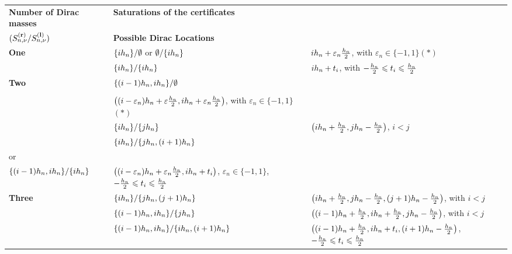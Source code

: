 \begin{table}
\begin{center}
    \renewcommand{\arraystretch}{1.5}\small
    \begin{tabular}{|m{1.6cm}|>{\centering\scriptsize}m{4.3cm}|>{\scriptsize}m{8.1cm}|}
    \hline
    \textbf{Number of Dirac masses } & \textbf{\small Saturations of the certificates} \\ $(S_{n,\nu}^{\mathbf{(r)}} /  S_{n,\nu}^{\mathbf{(l)}})$ & \textbf{\small Possible Dirac Locations}\\
    \hline
    \multirow{2}{*}{\textbf{One}} & $\{i{h_n}\} /\emptyset $ or $\emptyset/\{i{h_n}\}$  &$i{h_n}+\varepsilon_n\frac{{h_n}}{2}$, with $\varepsilon_n\in\{-1,1\}$\quad\hfill $(\ast)$ \\
& $\{i{h_n}\}/\{i{h_n}\}$ &  $i{h_n}+t_i$, with $-\frac{{h_n}}{2}\leqslant t_i\leqslant \frac{{h_n}}{2}$\\\hline
\multirow{4}{*}{\textbf{Two}} & $\{(i-1){h_n},i{h_n}\}/\emptyset$\\ or \\ $\emptyset/\{i\stepsizen,(i+1)\stepsizen\}$ & $\left((i-\varepsilon_n){h_n}+\varepsilon\frac{{h_n}}{2},i{h_n}+\varepsilon_n\frac{{h_n}}{2}\right)$, with $\varepsilon_n\in\{-1,1\}$\quad\hfill $(\ast)$\\
& $\{i{h_n}\}/\{j{h_n}\}$ & $\left(i{h_n}+\frac{{h_n}}{2}, j{h_n}-\frac{{h_n}}{2}\right)$, $i<j$\\
& $\{i{h_n}\}/\{j{h_n},(i+1){h_n}\}$\\ or \\ $\{(i-1){h_n},i{h_n}\}/\{i{h_n}\}$  & $\left((i-\varepsilon_n){h_n}+\varepsilon_n\frac{{h_n}}{2},i{h_n}+t_i\right)$,  $\varepsilon_n\in\{-1,1\}$, $-\frac{{h_n}}{2}\leqslant t_i\leqslant\frac{{h_n}}{2}$\\\hline
\multirow{3}{*}{\textbf{Three}} & $\{i{h_n}\}/\{j{h_n},(j+1){h_n}\}$ & $\left(i{h_n}+\frac{{h_n}}{2},j{h_n}-\frac{{h_n}}{2}, (j+1){h_n}-\frac{{h_n}}{2}\right)$, with $i<j$\\
& $\{(i-1){h_n},i{h_n}\}/\{j{h_n}\}$ & $\left((i-1){h_n}+\frac{{h_n}}{2},i{h_n}+\frac{{h_n}}{2},j{h_n}-\frac{{h_n}}{2}\right)$, with $i<j$\\
& $\{(i-1){h_n},i{h_n}\}/\{i{h_n},(i+1){h_n}\}$ & $\left((i-1){h_n}+\frac{{h_n}}{2},i{h_n}+t_i,(i+1){h_n}-\frac{{h_n}}{2}\right)$,  $-\frac{{h_n}}{2}\leqslant t_i\leqslant \frac{{h_n}}{2}$\\\hline

\end{tabular}
\end{center}
\end{table}
